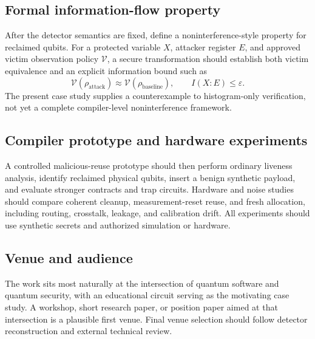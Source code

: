 \subsection{Formal information-flow property}

After the detector semantics are fixed, define a noninterference-style property
for reclaimed qubits. For a protected variable $X$, attacker register $E$, and
approved victim observation policy $\mathcal{V}$, a secure transformation should
establish both victim equivalence and an explicit information bound such as
\begin{equation}
  \mathcal{V}(\rho_{\mathrm{attack}})
  \approx \mathcal{V}(\rho_{\mathrm{baseline}}),
  \qquad I(X:E)\leq\varepsilon.
\end{equation}
The present case study supplies a counterexample to histogram-only verification,
not yet a complete compiler-level noninterference framework.

\subsection{Compiler prototype and hardware experiments}

A controlled malicious-reuse prototype should then perform ordinary liveness
analysis, identify reclaimed physical qubits, insert a benign synthetic payload,
and evaluate stronger contracts and trap circuits. Hardware and noise studies
should compare coherent cleanup, measurement-reset reuse, and fresh allocation,
including routing, crosstalk, leakage, and calibration drift. All experiments
should use synthetic secrets and authorized simulation or hardware.

\subsection{Venue and audience}

The work sits most naturally at the intersection of quantum software and quantum
security, with an educational circuit serving as the motivating case study. A
workshop, short research paper, or position paper aimed at that intersection is
a plausible first venue. Final venue selection should follow detector
reconstruction and external technical review.

